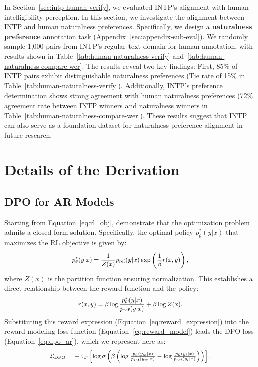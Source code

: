\documentclass[11pt]{article}
\begin{document}
In Section~\ref{sec:intp-human-verify}, we evaluated INTP's alignment with human intelligibility perception. In this section, we investigate the alignment between INTP and human naturalness preferences. Specifically, we design a \textbf{naturalness preference} annotation task (Appendix~\ref{sec:appendix-sub-eval}). We randomly sample 1,000 pairs from INTP's regular text domain for human annotation, with results shown in Table~\ref{tab:human-naturalness-verify} and~\ref{tab:human-naturalness-compare-wer}. The results reveal two key findings: First, 85\% of INTP pairs exhibit distinguishable naturalness preferences (Tie rate of 15\% in Table~\ref{tab:human-naturalness-verify}). Additionally, INTP's preference determination shows strong agreement with human naturalness preferences (72\% agreement rate between INTP winners and naturalness winners in Table~\ref{tab:human-naturalness-compare-wer}). These results suggest that INTP can also serve as a foundation dataset for naturalness preference alignment in future research.

\section{Details of the Derivation}\label{sec:appendix-derivation}


\subsection{DPO for AR Models}\label{sec:appendix-derivation-ar}

Starting from Equation~\ref{eq:rl_obj}, \citet{dpo} demonstrate that the optimization problem admits a closed-form solution. Specifically, the optimal policy \( p_\theta^*(y | x) \) that maximizes the RL objective is given by:
\begin{equation}
    {\small
    \begin{aligned}
p_\theta^*(y | x) = \frac{1}{Z(x)} p_{\text{ref}}(y | x) \exp\left(\frac{1}{\beta} r(x, y)\right),
    \end{aligned}
    }
\label{eq:optimal_policy}
\end{equation}
where \( Z(x) \) is the partition function ensuring normalization. This establishes a direct relationship between the reward function and the policy:
\begin{equation}
    {\small
    \begin{aligned}
    r(x, y) = \beta \log \frac{p_\theta^*(y | x)}{p_{\text{ref}}(y | x)} + \beta \log Z(x).
    \end{aligned}
    }
\label{eq:reward_expression}
\end{equation}
Substituting this reward expression (Equation~\ref{eq:reward_expression}) into the reward modeling loss function (Equation~\ref{eq:reward_model}) leads the DPO loss (Equation~\ref{eq:dpo_ar}), which we represent here as:
\[
    {\small
    \begin{aligned}
\mathcal{L}_\text{DPO} = -\mathbb{E}_{\mathcal{D}} \left[ \log \sigma\left( \beta \left( \log \tfrac{p_\theta(y_w | x)}{p_{\text{ref}}(y_w | x)} - \log \tfrac{p_\theta(y_l | x)}{p_{\text{ref}}(y_l | x)} \right) \right) \right].
    \end{aligned}
    }
\]
\end{document}
